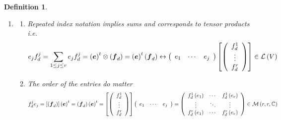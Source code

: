 \documentclass[aps,preprint]{revtex4}%
\newtheorem{definition}[theorem]{Definition}
\begin{document}
\begin{definition}
\begin{enumerate}
\item
\begin{enumerate}
\item Repeated index notation implies sums and corresponds to tensor products
i.e.%
\begin{equation}
e_{j}f_{d}^{j}=\sum_{1\leq j\leq r}e_{j}f_{d}^{j}=\left(  \boldsymbol{e}%
\right)  ^{t}\otimes\left(  \boldsymbol{f}_{d}\right)  =\left(  \boldsymbol{e}%
\right)  ^{t}\left(  \boldsymbol{f}_{d}\right)  \leftrightarrow\left(
\begin{array}
[c]{ccc}%
e_{1} & \cdots & e_{j}%
\end{array}
\right)  \left[  \left(
\begin{array}
[c]{c}%
f_{d}^{1}\\
\vdots\\
f_{d}^{r}%
\end{array}
\right)  \right]  \in\mathcal{L}\left(  V\right)
\end{equation}


\item The order of the entries {\Large do} matter%
\begin{equation}
f_{d}^{j}e_{j}=\left[  \left(  \boldsymbol{f}_{d}\right)  \right]  \left(
\boldsymbol{e}\right)  ^{t}=\left(  \boldsymbol{f}_{d}\right)  \left(
\boldsymbol{e}\right)  ^{t}=\left[  \left(
\begin{array}
[c]{c}%
f_{d}^{1}\\
\vdots\\
f_{d}^{r}%
\end{array}
\right)  \right]  \left(
\begin{array}
[c]{ccc}%
e_{1} & \cdots & e_{j}%
\end{array}
\right)  =\left(
\begin{array}
[c]{ccc}%
f_{d}^{1}\left(  e_{1}\right)  & \cdots & f_{d}^{1}\left(  e_{r}\right) \\
\vdots & \ddots & \vdots\\
f_{d}^{r}\left(  e_{1}\right)  & \cdots & f_{d}^{r}\left(  e_{r}\right)
\end{array}
\right)  \in\mathcal{M}\left(  r,r,\mathbb{C}\right)
\end{equation}



\end{enumerate}
\end{enumerate}
\end{definition}
\end{document}
